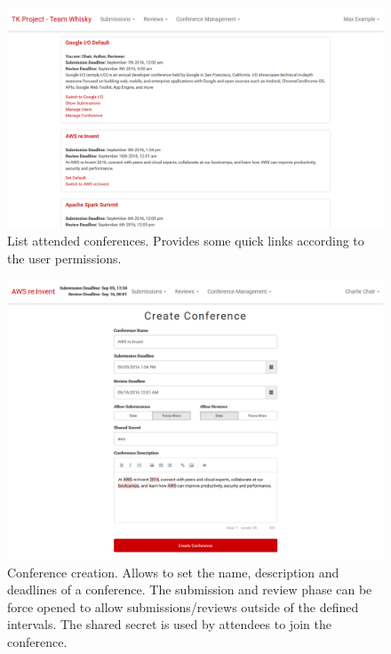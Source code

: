 \documentclass[nochapterpage,nopartpage,noheadingspace,numbersubsubsec,bigchapter,colorback,accentcolor=tud9c,10pt]{tudreport}
\begin{document}
        \begin{figure}[!ht]
            \centering
            \includegraphics[width=\textwidth]{img/ui-list-conferences}
            \caption{List attended conferences. Provides some quick links according to the user permissions.}
            \label{fig:appendix:screenshots:ui-list-conferences}
        \end{figure}

        \begin{figure}[!ht]
            \centering
            \includegraphics[width=\textwidth]{img/ui-conference-create}
            \caption{Conference creation. Allows to set the name, description and deadlines of a conference. The submission and review phase can be force opened to allow submissions/reviews outside of the defined intervals. The shared secret is used by attendees to join the conference.}
            \label{fig:appendix:screenshots:ui-conference-create}
        \end{figure}
\end{document}
